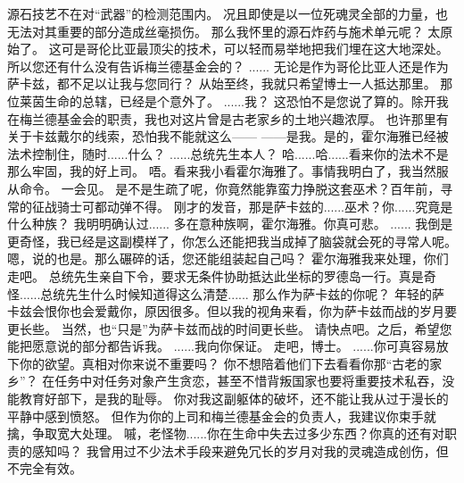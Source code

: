 \documentclass[openany]{book}
\begin{document}
\begin{dialogue}
     源石技艺不在对“武器”的检测范围内。
     况且即使是以一位死魂灵全部的力量，也无法对其重要的部分造成丝毫损伤。
     那么我怀里的源石炸药与施术单元呢？
     太原始了。
     这可是哥伦比亚最顶尖的技术，可以轻而易举地把我们埋在这大地深处。
     所以您还有什么没有告诉梅兰德基金会的？
     ......
     无论是作为哥伦比亚人还是作为萨卡兹，都不足以让我与您同行？
     从始至终，我就只希望博士一人抵达那里。
     那位莱茵生命的总辖，已经是个意外了。
     ......我？
     这恐怕不是您说了算的。除开我在梅兰德基金会的职责，我也对这片曾是古老家乡的土地兴趣浓厚。
     也许那里有关于卡兹戴尔的线索，恐怕我不能就这么——
     ——是我。是的，霍尔海雅已经被法术控制住，随时......什么？
     ......总统先生本人？
     哈......哈......看来你的法术不是那么牢固，我的好上司。
     唔。看来我小看霍尔海雅了。事情我明白了，我当然服从命令。
     一会见。
     是不是生疏了呢，你竟然能靠蛮力挣脱这套巫术？百年前，寻常的征战骑士可都动弹不得。
     刚才的发音，那是萨卡兹的......巫术？你......究竟是什么种族？
     我明明确认过......
     多在意种族啊，霍尔海雅。你真可悲。
     ......
     我倒是更奇怪，我已经是这副模样了，你怎么还能把我当成掉了脑袋就会死的寻常人呢。
     嗯，说的也是。那么碾碎的话，您还能组装起自己吗？
     霍尔海雅我来处理，你们走吧。
     总统先生亲自下令，要求无条件协助抵达此坐标的罗德岛一行。真是奇怪......总统先生什么时候知道得这么清楚......
     那么作为萨卡兹的你呢？
     年轻的萨卡兹会恨你也会爱戴你，原因很多。但以我的视角来看，你为萨卡兹而战的岁月要更长些。
     当然，也“只是”为萨卡兹而战的时间更长些。
     请快点吧。之后，希望您能把愿意说的部分都告诉我。
     ......我向你保证。
     走吧，博士。
     ......你可真容易放下你的欲望。真相对你来说不重要吗？
     你不想陪着他们下去看看你那“古老的家乡”？
     在任务中对任务对象产生贪恋，甚至不惜背叛国家也要将重要技术私吞，没能教育好部下，是我的耻辱。
     你对我这副躯体的破坏，还不能让我从过于漫长的平静中感到愤怒。
     但作为你的上司和梅兰德基金会的负责人，我建议你束手就擒，争取宽大处理。
     嘁，老怪物......你在生命中失去过多少东西？你真的还有对职责的感知吗？
     我曾用过不少法术手段来避免冗长的岁月对我的灵魂造成创伤，但不完全有效。

\end{dialogue}
\end{document}

